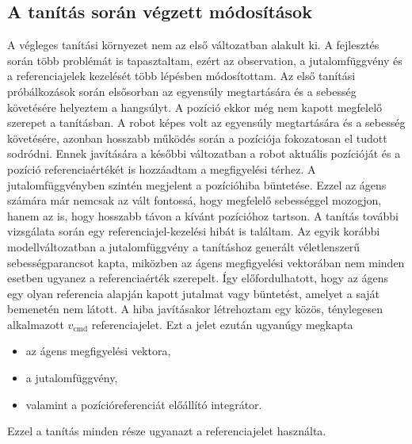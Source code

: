 \documentclass[12pt,a4paper]{report}
\begin{document}
	\subsection{A tanítás során végzett módosítások}
	A végleges tanítási környezet nem az első változatban alakult ki. A fejlesztés során több problémát is tapasztaltam, ezért az observation, a jutalomfüggvény és a referenciajelek kezelését több lépésben módosítottam.
	\newline
	\newline
	Az első tanítási próbálkozások során elsősorban az egyensúly megtartására és a sebesség követésére helyeztem a hangsúlyt. A pozíció ekkor még nem kapott megfelelő szerepet a tanításban. A robot képes volt az egyensúly megtartására és a sebesség követésére, azonban hosszabb működés során a pozíciója fokozatosan el tudott sodródni.
	\newline
	\newline
	Ennek javítására a későbbi változatban a robot aktuális pozícióját és a pozíció referenciaértékét is hozzáadtam a megfigyelési térhez. A jutalomfüggvényben szintén megjelent a pozícióhiba büntetése. Ezzel az ágens számára már nemcsak az vált fontossá, hogy megfelelő sebességgel mozogjon, hanem az is, hogy hosszabb távon a kívánt pozícióhoz tartson.
	\newline
	\newline
	A tanítás további vizsgálata során egy referenciajel-kezelési hibát is találtam. Az egyik korábbi modellváltozatban a jutalomfüggvény a tanításhoz generált véletlenszerű sebességparancsot kapta, miközben az ágens megfigyelési vektorában nem minden esetben ugyanez a referenciaérték szerepelt. Így előfordulhatott, hogy az ágens egy olyan referencia alapján kapott jutalmat vagy büntetést, amelyet a saját bemenetén nem látott.
	\newline
	\newline
	A hiba javításakor létrehoztam egy közös, ténylegesen alkalmazott $v_{\mathrm{cmd}}$ referenciajelet. Ezt a jelet ezután ugyanúgy megkapta
	\begin{itemize}
		\item az ágens megfigyelési vektora,
		\item a jutalomfüggvény,
		\item valamint a pozícióreferenciát előállító integrátor.
	\end{itemize}
	Ezzel a tanítás minden része ugyanazt a referenciajelet használta.
	\newline
	\newline
\end{document}
